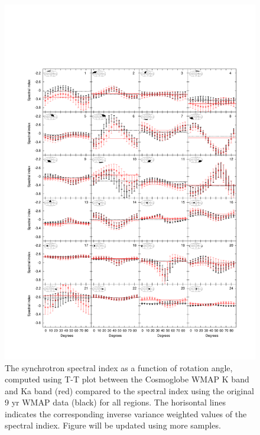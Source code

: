 \documentclass[twocolumn]{../../common/aa}
\newcommand{\red}[0]{\color{red}}
\begin{document}
\begin{figure}
	\centering
	\includegraphics[width=\linewidth]{figures/ut_big_multialphaplot.pdf}
	\caption{The synchrotron spectral index as a function of rotation angle, computed using T-T plot between the Cosmoglobe WMAP K band and Ka band (red) compared to the spectral index using the original 9 yr WMAP data (black) for all regions. The horisontal lines indicates the corresponding inverse variance weighted values of the spectral indiex. {\red Figure will be updated using more samples.}}
        \label{fig:beta_bigalpha}
\end{figure}
\end{document}
